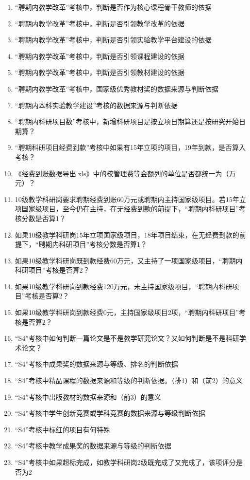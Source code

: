 \documentclass[UTF8,fontset=windowsnew]{ctexart}
\newcommand*\circled[1]{\tikz[baseline=(char.base)]{\node[shape=circle,draw,inner sep=2pt] (char) {#1};}}
\begin{document}
\begin{enumerate}
  \item ``聘期内教学改革''考核中，判断是否作为核心课程骨干教师的依据
  \item ``聘期内教学改革''考核中，判断是否引领教学改革的依据
  \item ``聘期内教学改革''考核中，判断是否引领实验教学平台建设的依据
  \item ``聘期内教学改革''考核中，判断是否引领课程建设的依据
  \item ``聘期内教学改革''考核中，判断是否引领教材建设的依据
  \item ``聘期内教学改革''考核中，国家级优秀教材奖的数据来源与判断依据
  \item ``聘期内本科实验教学建设''考核的数据来源与判断依据
  \item ``聘期内科研项目数''考核中，新增科研项目是按立项日期算还是按研究开始日期算？
  \item ``聘期科研项目经费到款''考核中如果有15年立项的项目，19年到款，是否算入考核？
  \item 《经费到账数据导出.xls》中的校管理费等金额列的单位是否都统一为（万元）？
  \item 10级教学科研岗要求聘期经费到账60万元或聘期内主持国家级项目。若15年立项国家级项目，至今仍在主持，在无经费到款的前提下，``聘期内科研项目''考核分数是否算1？
  \item 如果10级教学科研岗15年立项国家级项目，18年项目结束，在无经费到款的前提下，``聘期内科研项目''考核分数是否算1？
  \item 如果10级教学科研岗既到款经费60万元，又主持了一项国家级项目，``聘期内科研项目''考核是否算2？
  \item 如果10级教学科研岗到款经费120万元，未主持国家级项目，``聘期内科研项目''考核是否算2？
  \item 如果10级教学科研岗到款经费0元，主持国家级项目2项，``聘期内科研项目''考核是否算2？
  \item ``S4''考核中如何判断一篇论文是不是教学研究论文？又如何判断是不是科研学术论文？
  \item ``S4''考核中成果奖的数据来源与等级、排名的判断依据
  \item ``S4''考核中精品课程的数据来源和等级的判断依据。（排1）和（前2）的意义
  \item ``S4''考核中出版教材的数据来源和（前3）的意义
  \item ``S4''考核中学生创新竞赛或学科竞赛的数据来源与等级判断依据
  \item ``S4''考核中标红的项目有何特殊
  \item ``S4''考核中教学成果奖的数据来源与等级的判断依据
  \item ``S4''考核中如果超标完成，如教学科研岗2级既完成了\circled{1}又完成了\circled{2}，该项评分是否为2

\end{enumerate}
\end{document}
